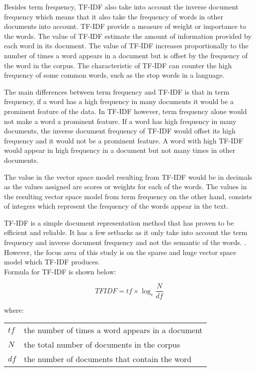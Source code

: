 Besides term frequency, TF-IDF also take into account the inverse document frequency which means that it also take the frequency of words in other documents into account. TF-IDF provide a measure of weight or importance to the words. The value of TF-IDF estimate the amount of information provided by each word in its document. The value of TF-IDF increases proportionally to the number of times a word appears in a document but is offset by the frequency of the word in the corpus. \cite{textMiningTfidf} The characteristic of TF-IDF can counter the high frequency of some common words, such as the stop words in a language. 

The main differences between term frequency and TF-IDF is that in term frequency, if a word has a high frequency in many documents it would be a prominent feature of the data. In TF-IDF however, term frequency alone would not make a word a prominent feature. If a word has high frequency in many documents, the inverse document frequency of TF-IDF would offset its high frequency and it would not be a prominent feature. A word with high TF-IDF would appear in high frequency in a document but not many times in other documents. 

The value in the vector space model resulting from TF-IDF would be in decimals as the values assigned are scores or weights for each of the words. The values in the resulting vector space model from term frequency on the other hand, consists of integers which represent the frequency of the words appear in the text.

TF-IDF is a simple document representation method that has proven to be efficient and reliable. It has a few setbacks as it only take into account the term frequency and inverse document frequency and not the semantic of the words. \cite{tfidfDrawback}. However, the focus area of this study is on the sparse and huge vector space model which TF-IDF produces.\\

Formula for TF-IDF is shown below:

\begin{equation}
TFIDF = tf \times \log_e \frac{N}{df}
\end{equation}
	
where:
	
\begin{center}
\begin{tabular}{l @{ $=$ } l}
	$tf$ & the number of times a word appears in a document \\
	$N$ & the total number of documents in the corpus \\
	$df$ & the number of documents that contain the word
\end{tabular}
\end{center}

